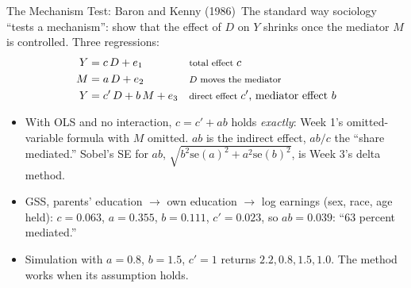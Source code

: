 \documentclass[aspectratio=169,11pt,xcolor=dvipsnames]{beamer}
\newcommand{\SE}{\mathrm{se}}
\newcommand{\core}{\,\raisebox{0.6pt}{\textcolor{corestar}{$\bigstar$}}}
\begin{document}
\begin{frame}{The Mechanism Test: Baron and Kenny (1986)\core}
The standard way sociology ``tests a mechanism'': show that the effect of
$D$ on $Y$ shrinks once the mediator $M$ is controlled. Three regressions:
\begin{align*}
  Y &= c\,D + e_1 && \text{\footnotesize total effect } c \\
  M &= a\,D + e_2 && \text{\footnotesize $D$ moves the mediator} \\
  Y &= c'\,D + b\,M + e_3 && \text{\footnotesize direct effect } c' \text{, mediator effect } b
\end{align*}
\begin{itemize}\itemsep1pt
  \item With OLS and no interaction, $c = c' + ab$ holds \emph{exactly}:
        Week 1's omitted-variable formula with $M$ omitted. $ab$ is the
        \alert{indirect effect}, $ab/c$ the ``share mediated.'' Sobel's
        SE for $ab$, $\sqrt{b^2 \SE(a)^2 + a^2 \SE(b)^2}$, is Week 3's
        delta method.
  \item GSS, parents' education $\to$ own education $\to$ log earnings
        (sex, race, age held): $c = 0.063$, $a = 0.355$, $b = 0.111$,
        $c' = 0.023$, so $ab = 0.039$: ``63 percent mediated.''
  \item Simulation with $a = 0.8$, $b = 1.5$, $c' = 1$ returns
        $2.2, 0.8, 1.5, 1.0$. The method works when its assumption holds.
\end{itemize}
\end{frame}
\end{document}
